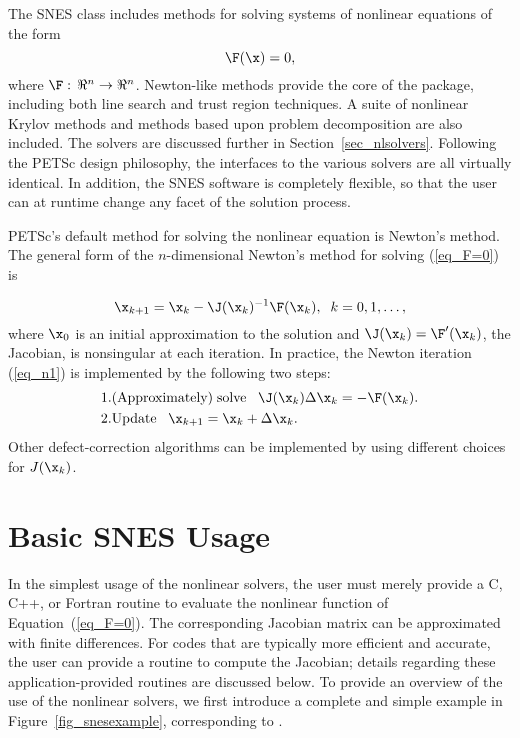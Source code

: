 The SNES class includes methods for solving systems of nonlinear equations of the form
\begin{equation}
\F(\x) = 0,
\label{eq_F=0}
\end{equation}
where $\F: \, \Re^n \to \Re^n$.
Newton-like methods provide the core of the package, including
 both line search 
and trust region  techniques.  A suite of nonlinear Krylov
methods and methods based upon problem decomposition are also included.  The
solvers are discussed further in Section~\ref{sec_nlsolvers}. Following the
PETSc design philosophy, the interfaces to the various solvers are all virtually
identical. In addition, the SNES software is completely flexible, so that the
user can at runtime change any facet of the solution process.

PETSc's default method for solving the nonlinear equation is Newton's method. The general form of the $n$-dimensional
Newton's method for solving (\ref{eq_F=0}) is

\begin{equation}
     \x_{k+1} = \x_k - \J(\x_k)^{-1} \F(\x_k), \;\; k=0,1, \ldots,
\label{eq_n1}
\end{equation}
where $ \x_0 $ is an initial approximation to the solution and
$ \J(\x_k) = \F'(\x_k) $, the Jacobian, is nonsingular at each iteration.
In practice, the Newton iteration (\ref{eq_n1}) is implemented by
the following two steps:
\begin{eqnarray}
  1. & {\rm (Approximately) \;solve\;\;\;} \J(\x_k) \Delta \x_k = -\F(\x_k).\\
  2. & {\rm Update\;\;\;} \x_{k+1} = \x_k + \Delta \x_k. \hspace{.225in}
\end{eqnarray}
Other defect-correction algorithms can be implemented by using different choices for $J(\x_k)$.

\section{Basic SNES Usage}
\label{sec_snesusage}

In the simplest usage of the nonlinear solvers, the user must merely
provide a C, C++, or Fortran routine to evaluate the nonlinear function
of Equation~(\ref{eq_F=0}).
The corresponding Jacobian  matrix
can be approximated with finite differences.
For codes that are typically more efficient and accurate, the
user can provide a routine to compute the Jacobian; details regarding these application-provided
routines are discussed below.
To provide an overview of the use of the nonlinear solvers,
we first introduce a complete and simple example in
Figure~\ref{fig_snesexample}, corresponding to
.

